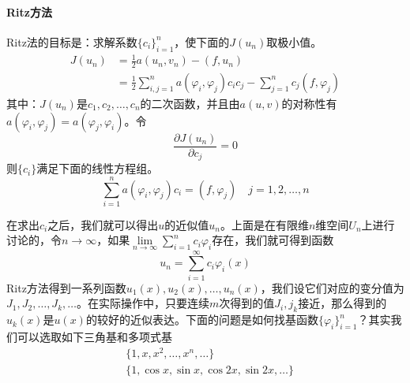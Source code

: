         \paragraph{Ritz方法}
        Ritz法的目标是：求解系数$\{c_i\}_{i = 1}^n$，使下面的$J(u_n)$取极小值。
        \begin{align*}
        J(u_n) &= \frac{1}{2} a(u_n,v_n) - (f,u_n)\\
        &=\frac{1}{2} \sum_{i,j = 1}^n a(\varphi_i,\varphi_j)c_ic_j - \sum_{j = 1}^n c_j(f,\varphi _j)
        \end{align*}
        其中：$J(u_n)$是$c_1,c_2,\dots,c_n$的二次函数，并且由$a(u,v)$的对称性有$a(\varphi_i,\varphi_j) = a(\varphi_j,\varphi_i)$。令
        \[
            \frac{\partial J(u_n)}{\partial c_j} = 0
        \]
        则$\{c_i\}$满足下面的线性方程组。
        \[
            \sum_{i = 1}^n a(\varphi_i,\varphi_j)c_i = (f,\varphi_j) \quad j = 1,2,\dots,n
        \]
        \par
        在求出$c_i$之后，我们就可以得出$u$的近似值$u_n$。上面是在有限维$n$维空间$U_n$上进行讨论的，令$n\rightarrow \infty$，如果$\lim\limits_{n\rightarrow\infty} \sum\limits_{i = 1}^n c_i\varphi_i$存在，我们就可得到函数
        \[
            u_n = \sum_{i = 1}^\infty c_i \varphi_i(x)
        \]
        Ritz方法得到一系列函数$u_1(x),u_2(x),\dots,u_n(x)$，我们设它们对应的变分值为$J_1,J_2,\dots,J_k,\dots$。在实际操作中，只要连续$m$次得到的值$J_i,j_k$接近，那么得到的$u_k(x)$是$u(x)$的较好的近似表达。下面的问题是如何找基函数$\{\varphi_i\}_{i= 1}^n$？其实我们可以选取如下三角基和多项式基
        \begin{align*}
            &\{1,x,x^2,\dots,x^n,\dots\}\\
            &\{1,\cos x,\sin x,\cos 2x,\sin 2x,\dots\}
        \end{align*}
